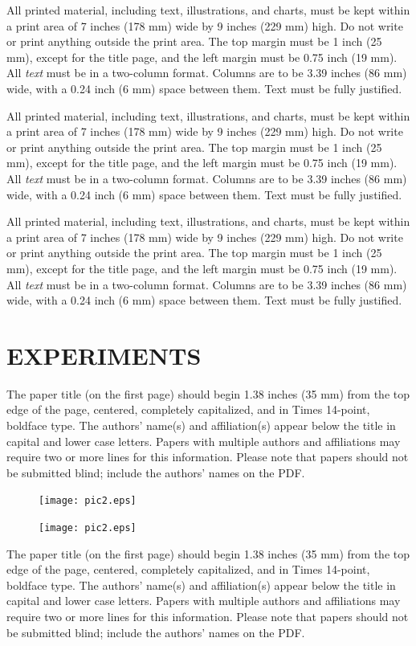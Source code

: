 \documentclass{article}
\begin{document}
All printed material, including text, illustrations, and charts, must be kept
within a print area of 7 inches (178 mm) wide by 9 inches (229 mm) high. Do
not write or print anything outside the print area. The top margin must be 1
inch (25 mm), except for the title page, and the left margin must be 0.75 inch
(19 mm).  All {\it text} must be in a two-column format. Columns are to be 3.39
inches (86 mm) wide, with a 0.24 inch (6 mm) space between them. Text must be
fully justified.

All printed material, including text, illustrations, and charts, must be kept
within a print area of 7 inches (178 mm) wide by 9 inches (229 mm) high. Do
not write or print anything outside the print area. The top margin must be 1
inch (25 mm), except for the title page, and the left margin must be 0.75 inch
(19 mm).  All {\it text} must be in a two-column format. Columns are to be 3.39
inches (86 mm) wide, with a 0.24 inch (6 mm) space between them. Text must be
fully justified.

All printed material, including text, illustrations, and charts, must be kept
within a print area of 7 inches (178 mm) wide by 9 inches (229 mm) high. Do
not write or print anything outside the print area. The top margin must be 1
inch (25 mm), except for the title page, and the left margin must be 0.75 inch
(19 mm).  All {\it text} must be in a two-column format. Columns are to be 3.39
inches (86 mm) wide, with a 0.24 inch (6 mm) space between them. Text must be
fully justified.


\section{EXPERIMENTS}
\label{sec:pagestyle}

The paper title (on the first page) should begin 1.38 inches (35 mm) from the
top edge of the page, centered, completely capitalized, and in Times 14-point,
boldface type.  The authors' name(s) and affiliation(s) appear below the title
in capital and lower case letters.  Papers with multiple authors and
affiliations may require two or more lines for this information. Please note
that papers should not be submitted blind; include the authors' names on the
PDF.
\begin{figure}[t]
  \centering
  \centerline{\texttt{[image: pic2.eps]}}
\end{figure}
\begin{figure}[t]
  \centering
  \centerline{\texttt{[image: pic2.eps]}}
\end{figure}
The paper title (on the first page) should begin 1.38 inches (35 mm) from the
top edge of the page, centered, completely capitalized, and in Times 14-point,
boldface type.  The authors' name(s) and affiliation(s) appear below the title
in capital and lower case letters.  Papers with multiple authors and
affiliations may require two or more lines for this information. Please note
that papers should not be submitted blind; include the authors' names on the
PDF.
\end{document}
